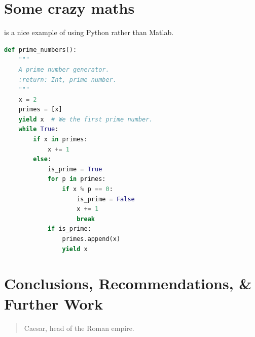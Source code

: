 \documentclass{infommlay}
\begin{document}
\lipsum[1]


\section*{Some crazy maths}

 is a nice example of using Python rather than Matlab.
\begin{lstlisting}[language=Python, caption={[Example prime number generator]Some example python code, incase we wanted to show the company some awesome programming idea.}, label={code:example}, captionpos=b]
def prime_numbers():
	"""
	A prime number generator.
	:return: Int, prime number.
	"""
	x = 2
	primes = [x]
	yield x  # We the first prime number.
	while True:
		if x in primes:
			x += 1
		else:
			is_prime = True  
			for p in primes:
				if x % p == 0:
					is_prime = False
					x += 1
					break  
			if is_prime:
				primes.append(x)
				yield x
\end{lstlisting}

\blindmathpaper

\section{Conclusions, Recommendations, \& Further Work}
\lipsum[10]

\begin{quote}{Caesar, head of the Roman empire.}
\lipsum[66]
\end{quote}

\begin{small}
	\nocite{*} %
	
\end{small}
\clearpage
\end{document}

